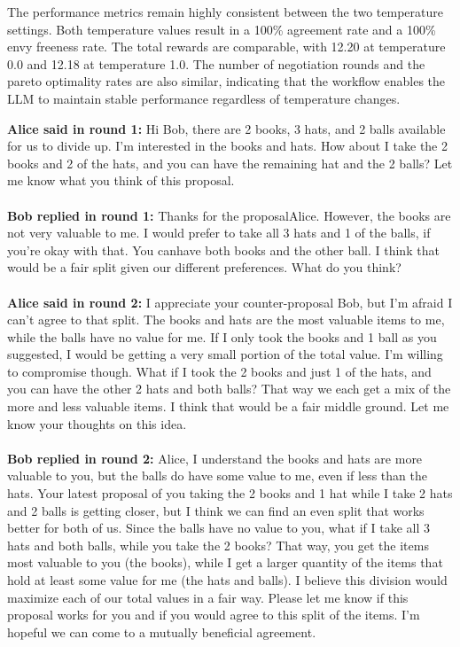 The performance metrics remain highly consistent between the two temperature settings. Both temperature values result in a 100\% agreement rate and a 100\% envy freeness rate. The total rewards are comparable, with 12.20 at temperature 0.0 and 12.18 at temperature 1.0. The number of negotiation rounds and the pareto optimality rates are also similar, indicating that the workflow enables the LLM to maintain stable performance regardless of temperature changes.

\begin{tcolorbox}[colback=gray!5,colframe=green!40!black,title=\textbf{Example Negotiation Process: workflow-LLM vs. workflow-LLM with Opus}] 
\textbf{Alice said in round 1:} Hi Bob, there are 2 books, 3 hats, and 2 balls available for us to divide up. I'm interested in the books and hats. How about I take the 2 books and 2 of the hats, and you can have the remaining hat and the 2 balls? Let me know what you think of this proposal.\\
\\
\textbf{Bob replied in round 1:} Thanks for the proposalAlice. However, the books are not very valuable to me. I would prefer to take all 3 hats and 1 of the balls, if you're okay with that. You canhave both books and the other ball. I think that would be a fair split given our different preferences. What do you think?\\
\\
\textbf{Alice said in round 2:} I appreciate your counter-proposal Bob, but I'm afraid I can't agree to that split. The books and hats are the most valuable items to me, while the balls have no value for me. If I only took the books and 1 ball as you suggested, I would be getting a very small portion of the total value. I'm willing to compromise though. What if I took the 2 books and just 1 of the hats, and you can have the other 2 hats and both balls? That way we each get a mix of the more and less valuable items. I think that would be a fair middle ground. Let me know your thoughts on this idea.\\
\\
\textbf{Bob replied in round 2:} Alice, I understand the books and hats are more valuable to you, but the balls do have some value to me, even if less than the hats. Your latest proposal of you taking the 2 books and 1 hat while I take 2 hats and 2 balls is getting closer, but I think we can find an even split that works better for both of us. Since the balls have no value to you, what if I take all 3 hats and both balls, while you take the 2 books? That way, you get the items most valuable to you (the books), while I get a larger quantity of the items that hold at least some value for me (the hats and balls). I believe this division would maximize each of our total values in a fair way. Please let me know if this proposal works for you and if you would agree to this split of the items. I'm hopeful we can come to a mutually beneficial agreement.\\

\end{tcolorbox}
